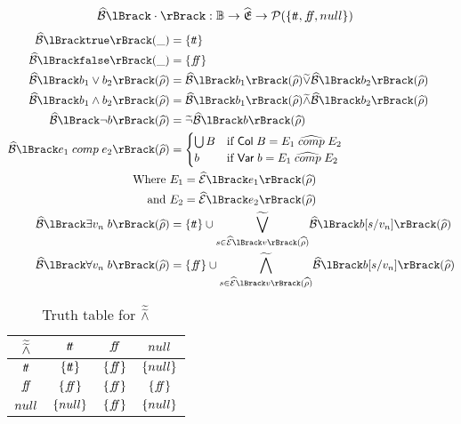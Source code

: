 \begin{align}
    \absboolsem{\cdot} &: \mathbb{B} \rightarrow \ab{\mathfrak{E}} \rightarrow \mathcal{P}(\{\true, \false, \mnull\}) \label{eq:bool-operation}
\end{align}
\begin{align}
    \absboolsem{\texttt{true}}(\_) &= \{\true\} \label{eq:abstract-bool-semantics-start} \\
    \absboolsem{\texttt{false}}(\_) &= \{\false\} \\
    \absboolsem{b_1 \lor b_2}(\ab{\environment}) &= \absboolsem{b_1}(\ab{\environment}) \aab{\lor} \absboolsem{b_2}(\ab{\environment}) \\
    \absboolsem{b_1 \land b_2}(\ab{\environment}) &= \absboolsem{b_1}(\ab{\environment}) \aab{\land} \absboolsem{b_2}(\ab{\environment}) \\
    \absboolsem{\neg b}(\ab{\environment}) &= \aab{\neg} \absboolsem{b}(\ab{\environment}) \\
    \absboolsem{e_1 \;comp\; e_2}(\ab{\environment}) &=
    \begin{cases}
        \bigcup B & \text{if } \mathsf{Col} \; B = E_1 \;\ab{\comp}\; E_2 \\
        b & \text{if } \mathsf{Var} \; b = E_1 \;\ab{\comp}\; E_2
    \end{cases} \label{eq:abstract-bool-semantics-end} \\
    \text{Where }& E_1 = \absexpsem{e_1}(\ab{\environment}) \\
    \text{and }& E_2 = \absexpsem{e_2}(\ab{\environment}) \\
    \absboolsem{\exists v_n \; b}(\ab{\environment}) &= \{\true\} \cup \underset{s \in \absexpsem{v}(\ab{\environment})}{\aab{\bigvee}} \absboolsem{b[s/v_n]}(\ab{\environment}) \\
    \absboolsem{\forall v_n \; b}(\ab{\environment}) &= \{\false\} \cup \underset{s \in \absexpsem{v}(\ab{\environment})}{\aab{\bigwedge}} \absboolsem{b[s/v_n]}(\ab{\environment})
\end{align}


\begin{table}[H]
    \centering
    \caption{Truth table for $\widetilde{\widetilde{\land}}$}
    \begin{tabular}{c|ccc}
        $\widetilde{\widetilde{\land}}$ & $t\!t$ & $f\!\!f$ & $null$ \\
        \hline
        $t\!t$ & $\{t\!t\}$ & $\{f\!\!f\}$ & $\{null\}$ \\
        $f\!\!f$ & $\{f\!\!f\}$ & $\{f\!\!f\}$ & $\{f\!\!f\}$ \\
        $null$ & $\{null\}$ & $\{f\!\!f\}$ & $\{null\}$ \\
    \end{tabular}
    \label{tab:aaabland}
\end{table}

